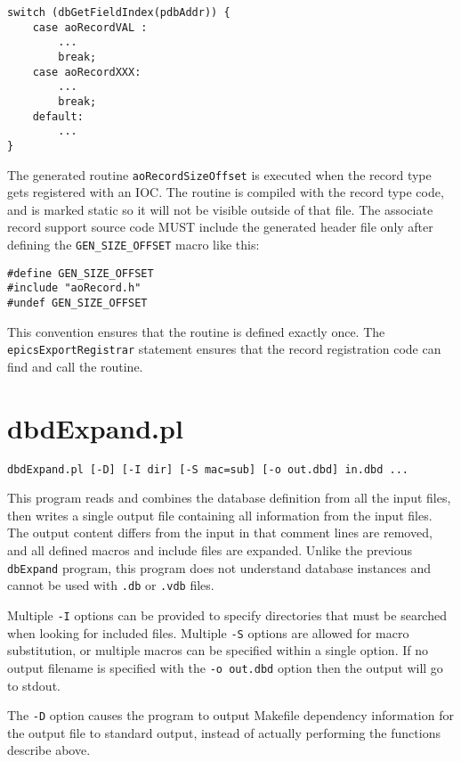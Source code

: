 \begin{verbatim}
switch (dbGetFieldIndex(pdbAddr)) {
    case aoRecordVAL :
        ...
        break;
    case aoRecordXXX:
        ...
        break;
    default:
        ...
}
\end{verbatim}

The generated routine \verb|aoRecordSizeOffset| is executed when the record type gets registered with an IOC.
The routine is compiled with the record type code, and is marked static so it will not be visible outside of that file.
The associate record support source code MUST include the generated header file only after defining the \verb|GEN_SIZE_OFFSET| macro like this:

\begin{verbatim}
#define GEN_SIZE_OFFSET
#include "aoRecord.h"
#undef GEN_SIZE_OFFSET
\end{verbatim}

This convention ensures that the routine is defined exactly once.
The \verb|epicsExportRegistrar| statement ensures that the record registration code can find and call the routine.

\section{dbdExpand.pl}

\begin{verbatim}
dbdExpand.pl [-D] [-I dir] [-S mac=sub] [-o out.dbd] in.dbd ...
\end{verbatim}

This program reads and combines the database definition from all the input files, then writes a single output file containing all information from the 
input files.
The output content differs from the input in that comment lines are removed, and all defined macros and include files are expanded.
Unlike the previous \verb|dbExpand| program, this program does not understand database instances and cannot be used with \verb|.db| or \verb|.vdb| files.

Multiple \verb|-I| options can be provided to specify directories that must be searched when looking for included files.
Multiple \verb|-S| options are allowed for macro substitution, or multiple macros can be specified within a single option.
If no output filename is specified with the \verb|-o out.dbd| option then the output will go to stdout.

The \verb|-D| option causes the program to output Makefile dependency information for the output file to standard output, instead of actually performing the functions describe above.

